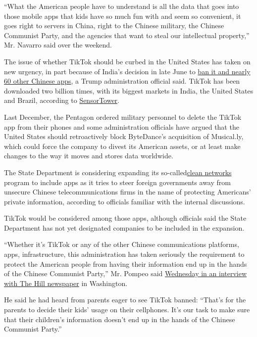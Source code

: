 ``What the American people have to understand is all the data that goes
into those mobile apps that kids have so much fun with and seem so
convenient, it goes right to servers in China, right to the Chinese
military, the Chinese Communist Party, and the agencies that want to
steal our intellectual property,'' Mr. Navarro said over the weekend.

The issue of whether TikTok should be curbed in the United States has
taken on new urgency, in part because of India's decision in late June
to
\href{https://www.state.gov/secretary-michael-r-pompeo-with-laura-ingraham-of-fox-news-3/}{ban
it and nearly 60 other Chinese apps}, a Trump administration official
said. TikTok has been downloaded two billion times, with its biggest
markets in India, the United States and Brazil, according to
\href{https://sensortower.com/blog/tiktok-downloads-2-billion}{SensorTower}.

Last December, the Pentagon ordered military personnel to delete the
TikTok app from their phones and some administration officials have
argued that the United States should retroactively block ByteDance's
acquisition of Musical.ly, which could force the company to divest its
American assets, or at least make changes to the way it moves and stores
data worldwide.

The State Department is considering expanding its
so-called\href{https://www.state.gov/the-tide-is-turning-toward-trusted-5g-vendors/}{clean
networks} program to include apps as it tries to steer foreign
governments away from unsecure Chinese telecommunications firms in the
name of protecting Americans' private information, according to
officials familiar with the internal discussions.

TikTok would be considered among those apps, although officials said the
State Department has not yet designated companies to be included in the
expansion.

``Whether it's TikTok or any of the other Chinese communications
platforms, apps, infrastructure, this administration has taken seriously
the requirement to protect the American people from having their
information end up in the hands of the Chinese Communist Party,'' Mr.
Pompeo said
\href{https://www.state.gov/secretary-michael-r-pompeo-with-bob-cusack-editor-in-chief-of-the-hill/}{Wednesday
in an interview with The Hill newspaper} in Washington.

He said he had heard from parents eager to see TikTok banned: ``That's
for the parents to decide their kids' usage on their cellphones. It's
our task to make sure that their children's information doesn't end up
in the hands of the Chinese Communist Party.''

